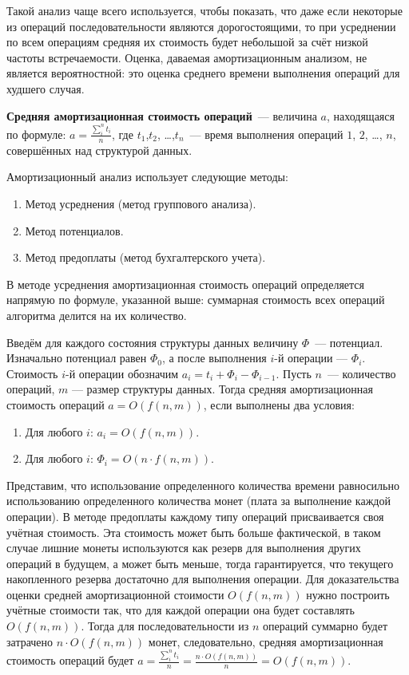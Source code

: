 Такой анализ чаще всего используется, чтобы показать, что даже если некоторые из операций последовательности являются
дорогостоящими, то при усреднении по всем операциям средняя их стоимость будет небольшой за счёт низкой частоты встречаемости.
Оценка, даваемая амортизационным анализом, не является вероятностной:
это оценка среднего времени выполнения операций для худшего случая.

\textbf{Средняя амортизационная стоимость операций}~--- величина $a$, находящаяся по формуле: $a=\frac{\sum^{n}_{i}{t_i}}{n}$, где $t_1$,$t_2$,
\dots,$t_n$~--- время выполнения операций $1$, $2$, \dots, $n$, совершённых над структурой данных.

Амортизационный анализ использует следующие методы:
\begin{enumerate}
    \item Метод усреднения (метод группового анализа).
    \item Метод потенциалов.
    \item Метод предоплаты (метод бухгалтерского учета).
\end{enumerate}

В методе усреднения амортизационная стоимость операций определяется напрямую по формуле, указанной выше:
суммарная стоимость всех операций алгоритма делится на их количество.

Введём для каждого состояния структуры данных величину $\Phi$~--- потенциал.
Изначально потенциал равен $\Phi_0$, а после выполнения $i$-й операции — $\Phi_i$.
Стоимость $i$-й операции обозначим $a_i=t_i+\Phi_{i}-\Phi_{i-1}$.
Пусть $n$~--- количество операций, $m$ — размер структуры данных.
Тогда средняя амортизационная стоимость операций $a=O(f(n,m))$, если выполнены два условия:
\begin{enumerate}
    \item Для любого $i$: $a_i=O(f(n,m))$.
    \item Для любого $i$: $\Phi_{i}=O(n \cdot f(n,m))$.
\end{enumerate}

Представим, что использование определенного количества времени равносильно использованию определенного количества монет
(плата за выполнение каждой операции).
В методе предоплаты каждому типу операций присваивается своя учётная стоимость.
Эта стоимость может быть больше фактической, в таком случае лишние монеты используются как резерв для выполнения других
операций в будущем, а может быть меньше, тогда гарантируется, что текущего накопленного резерва достаточно для выполнения
операции.
Для доказательства оценки средней амортизационной стоимости $O(f(n,m))$ нужно построить учётные стоимости так,
что для каждой операции она будет составлять $O(f(n,m))$.
Тогда для последовательности из $n$ операций суммарно будет затрачено $n \cdot O(f(n,m))$ монет, следовательно,
средняя амортизационная стоимость операций будет $a=\frac{\sum^{n}_{i}{t_i}}{n}=\frac{n \cdot O(f(n,m))}{n}=O(f(n,m))$.

